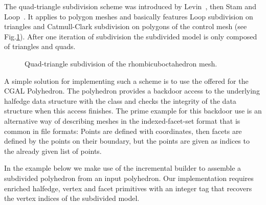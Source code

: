 
The quad-triangle subdivision scheme was introduced by
Levin~\cite{l-pg-03}, then Stam and Loop~\cite{qts}. It applies
to polygon meshes and basically features Loop subdivision on triangles
and Catmull-Clark subdivision on polygons of the control mesh (see
Fig.\ref{fig:quad-triangle}). After one iteration of subdivision the
subdivided model is only composed of triangles and quads. 



\begin{figure}[htb]
    \caption{Quad-triangle subdivision of the rhombicuboctahedron mesh.}
    \label{fig:quad-triangle}
\end{figure}

A simple solution for implementing such a scheme is to use the
 offered for the CGAL Polyhedron. 
The polyhedron provides a backdoor access to the
underlying halfedge data structure with the 
class and checks the
integrity of the data structure when this access finishes. The prime
example for this backdoor use is an alternative way of describing
meshes in the indexed-facet-set format that is common in file formats:
Points are defined with coordinates, then facets are
defined by the points on their boundary, but the points are given as
indices to the already given list of points.

In the example below we make use of the incremental builder to
assemble a subdivided polyhedron from an input polyhedron. Our implementation
requires enriched halfedge, vertex and facet primitives with an
integer tag that recovers the vertex indices of the subdivided model.

